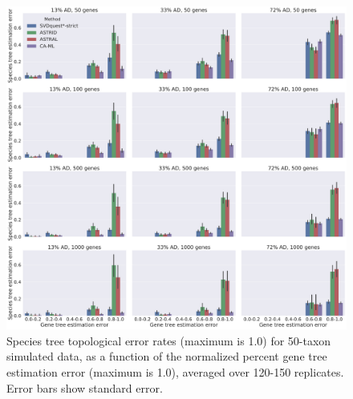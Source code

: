 \begin{figure}
  \centering
  \includegraphics[width=\textwidth]{svdquest-figs/concat_rfdists_all.pdf}
\caption[Species tree error rates of SVDquest*-strict, ASTRID, ASTRAL, and CA-ML on 50-taxon supergene datasets]{Species tree topological error rates (maximum is 1.0) for 50-taxon simulated data, as a function of the normalized percent
    gene tree estimation error (maximum is 1.0), averaged over 120-150 replicates.
    Error bars show standard
    error.}
\label{fig:s8}
\end{figure}

